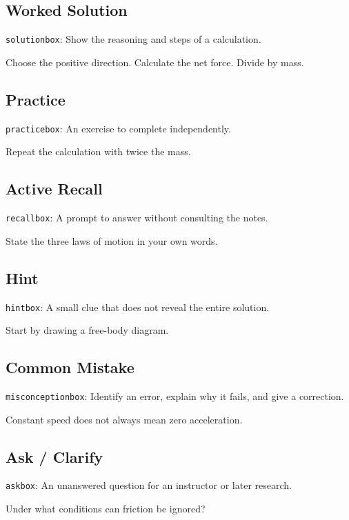 \documentclass[11pt]{article}
\begin{document}
\subsection{Worked Solution}
{\small\texttt{solutionbox}: Show the reasoning and steps of a calculation.}
\begin{solutionbox}
Choose the positive direction. Calculate the net force. Divide by mass.
\end{solutionbox}
\subsection{Practice}
{\small\texttt{practicebox}: An exercise to complete independently.}
\begin{practicebox}
Repeat the calculation with twice the mass.
\end{practicebox}
\subsection{Active Recall}
{\small\texttt{recallbox}: A prompt to answer without consulting the notes.}
\begin{recallbox}
State the three laws of motion in your own words.
\end{recallbox}
\subsection{Hint}
{\small\texttt{hintbox}: A small clue that does not reveal the entire solution.}
\begin{hintbox}
Start by drawing a free-body diagram.
\end{hintbox}
\subsection{Common Mistake}
{\small\texttt{misconceptionbox}: Identify an error, explain why it fails, and give a correction.}
\begin{misconceptionbox}
Constant speed does not always mean zero acceleration.
\end{misconceptionbox}
\subsection{Ask / Clarify}
{\small\texttt{askbox}: An unanswered question for an instructor or later research.}
\begin{askbox}
Under what conditions can friction be ignored?
\end{askbox}
\end{document}
